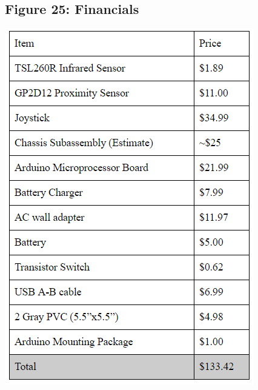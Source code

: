 \documentclass{article}
\begin{document}
\subsection{Figure 25: Financials}
\begin{center}{\includegraphics[]{Financials.png}}\end{center}
\end{document}
